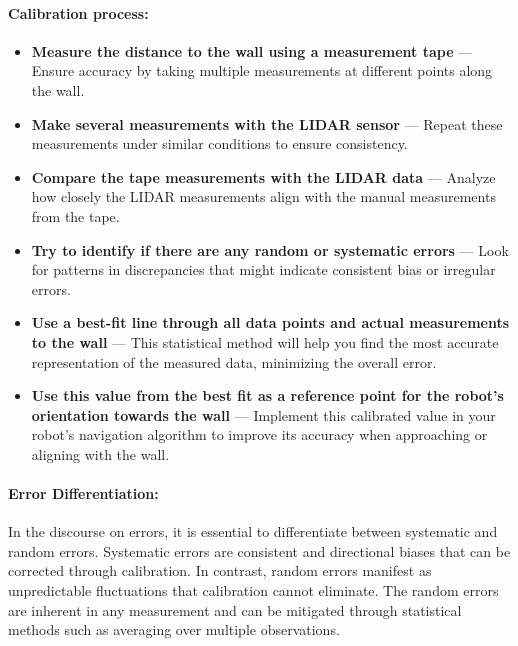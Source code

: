 \documentclass[12pt,a4paper]{article}
\begin{document}
	\paragraph{Calibration process:}
	\begin{itemize}
		\item \textbf{Measure the distance to the wall using a measurement tape} — Ensure accuracy by taking multiple measurements at different points along the wall.
		\item \textbf{Make several measurements with the LIDAR sensor} — Repeat these measurements under similar conditions to ensure consistency.
		\item \textbf{Compare the tape measurements with the LIDAR data} — Analyze how closely the LIDAR measurements align with the manual measurements from the tape.
		\item \textbf{Try to identify if there are any random or systematic errors} — Look for patterns in discrepancies that might indicate consistent bias or irregular errors.
		\item \textbf{Use a best-fit line through all data points and actual measurements to the wall} — This statistical method will help you find the most accurate representation of the measured data, minimizing the overall error.
		\item \textbf{Use this value from the best fit as a reference point for the robot's orientation towards the wall} — Implement this calibrated value in your robot’s navigation algorithm to improve its accuracy when approaching or aligning with the wall. 
	\end{itemize}
	
	\paragraph{Error Differentiation:}
	In the discourse on errors, it is essential to differentiate between systematic and random errors. Systematic errors are consistent and directional biases that can be corrected through calibration. In contrast, random errors manifest as unpredictable fluctuations that calibration cannot eliminate. The random errors are inherent in any measurement and can be mitigated through statistical methods such as averaging over multiple observations.
\end{document}
